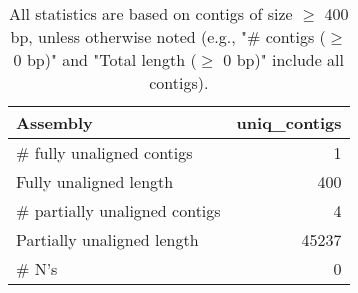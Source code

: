 \documentclass[12pt,a4paper]{article}
\begin{document}
\begin{table}[ht]
\begin{center}
\caption{All statistics are based on contigs of size $\geq$ 400 bp, unless otherwise noted (e.g., "\# contigs ($\geq$ 0 bp)" and "Total length ($\geq$ 0 bp)" include all contigs).}
\begin{tabular}{|l*{1}{|r}|}
\hline
Assembly & uniq\_contigs \\ \hline
\# fully unaligned contigs & 1 \\ \hline
Fully unaligned length & 400 \\ \hline
\# partially unaligned contigs & 4 \\ \hline
Partially unaligned length & 45237 \\ \hline
\# N's & 0 \\ \hline
\end{tabular}
\end{center}
\end{table}
\end{document}
